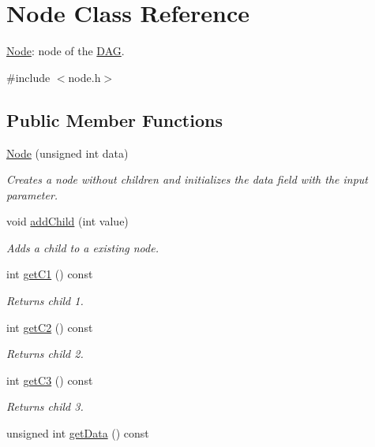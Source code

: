 \hypertarget{classNode}{}\section{Node Class Reference}
\label{classNode}


\hyperlink{classNode}{Node}\+: node of the \hyperlink{classDAG}{D\+AG}.  




{\ttfamily \#include $<$node.\+h$>$}

\subsection*{Public Member Functions}
\begin{DoxyCompactItemize}
\item 
\hyperlink{classNode_ad7349a128f40ad388aad4794d57ebbac}{Node} (unsigned int data)
\begin{DoxyCompactList}\small\item\em Creates a node without children and initializes the data field with the input parameter. \end{DoxyCompactList}\item 
void \hyperlink{classNode_abcb65bc062925a1e35bd26c4491c1f08}{add\+Child} (int value)
\begin{DoxyCompactList}\small\item\em Adds a child to a existing node. \end{DoxyCompactList}\item 
int \hyperlink{classNode_a9c32461ac040d49aff5d25b41b0353a7}{get\+C1} () const
\begin{DoxyCompactList}\small\item\em Returns child 1. \end{DoxyCompactList}\item 
int \hyperlink{classNode_aea950a9a2d050dc1aa571a5282c8b410}{get\+C2} () const
\begin{DoxyCompactList}\small\item\em Returns child 2. \end{DoxyCompactList}\item 
int \hyperlink{classNode_a3b941af12dfb8085e4f621ed62469ba5}{get\+C3} () const
\begin{DoxyCompactList}\small\item\em Returns child 3. \end{DoxyCompactList}\item 
unsigned int \hyperlink{classNode_aee9637a69c736a265a607f47ca2878d9}{get\+Data} () const

\end{DoxyCompactItemize}
